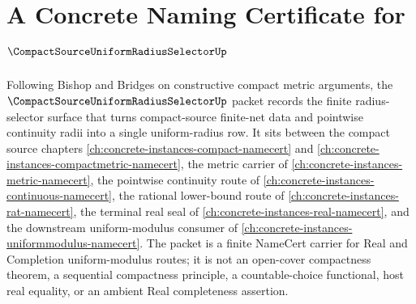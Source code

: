 \chapter{A Concrete Naming Certificate for $\CompactSourceUniformRadiusSelectorUp$}
\label{ch:concrete-instances-compact-source-uniform-radius-selector-namecert}

Following Bishop and Bridges on constructive compact metric arguments, the $\CompactSourceUniformRadiusSelectorUp$ packet records the finite radius-selector surface that turns compact-source finite-net data and pointwise continuity radii into a single uniform-radius row. It sits between the compact source chapters \autoref{ch:concrete-instances-compact-namecert} and \autoref{ch:concrete-instances-compactmetric-namecert}, the metric carrier of \autoref{ch:concrete-instances-metric-namecert}, the pointwise continuity route of \autoref{ch:concrete-instances-continuous-namecert}, the rational lower-bound route of \autoref{ch:concrete-instances-rat-namecert}, the terminal real seal of \autoref{ch:concrete-instances-real-namecert}, and the downstream uniform-modulus consumer of \autoref{ch:concrete-instances-uniformmodulus-namecert}. The packet is a finite NameCert carrier for Real and Completion uniform-modulus routes; it is not an open-cover compactness theorem, a sequential compactness principle, a countable-choice functional, host real equality, or an ambient Real completeness assertion.

